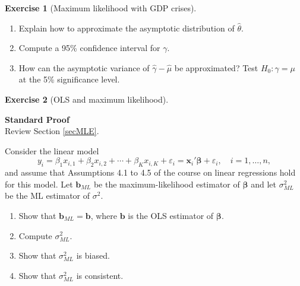 \documentclass[
  11pt,
]{book}
\theoremstyle{definition}
\theoremstyle{definition}
\theoremstyle{definition}
\newtheorem{exercise}{Exercise}[chapter]
\theoremstyle{definition}
\theoremstyle{remark}
\begin{document}
\begin{exercisebox}
\begin{exercise}[Maximum likelihood with GDP crises]
\begin{enumerate}
\def\labelenumi{\arabic{enumi}.}
\setcounter{enumi}{3}
\item
  Explain how to approximate the asymptotic distribution of \(\hat{\theta}\).
\item
  Compute a 95\% confidence interval for \(\gamma\).
\item
  How can the asymptotic variance of \(\hat{\gamma}-\hat{\mu}\) be approximated? Test \(H_0:\gamma=\mu\) at the 5\% significance level.
\end{enumerate}

\end{exercise}

\end{exercisebox}


\begin{exercisebox}

\begin{exercise}[OLS and maximum likelihood]
\protect\hypertarget{exr:estimation-ols-versus-mle}{}\label{exr:estimation-ols-versus-mle}

\textbf{Standard \textbar{} Proof}\\
Review Section \ref{secMLE}.

Consider the linear model \[y_i = \beta_1 x_{i,1} + \beta_2 x_{i,2} + \cdots + \beta_K x_{i,K} + \varepsilon_i = \mathbf{x}_i' \boldsymbol{\beta} + \varepsilon_i, \quad i = 1, \dots, n,\] and assume that Assumptions 4.1 to 4.5 of the course on linear regressions hold for this model. Let \(\mathbf{b}_{ML}\) be the maximum-likelihood estimator of \(\boldsymbol{\beta}\) and let \(\sigma^2_{ML}\) be the ML estimator of \(\sigma^2\).

\begin{enumerate}
\def\labelenumi{\arabic{enumi}.}
\item
  Show that \(\mathbf{b}_{ML} = \mathbf{b}\), where \(\mathbf{b}\) is the OLS estimator of \(\boldsymbol{\beta}\).
\item
  Compute \(\sigma^2_{ML}\).
\item
  Show that \(\sigma^2_{ML}\) is biased.
\item
  Show that \(\sigma^2_{ML}\) is consistent.
\end{enumerate}

\end{exercise}

\end{exercisebox}
\end{document}

